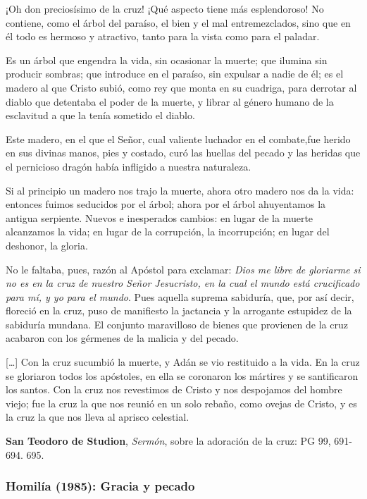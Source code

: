 \begin{patercite}
¡Oh don preciosísimo de la cruz! ¡Qué aspecto tiene más esplendoroso! No contiene, como el árbol del paraíso, el bien y el mal entremezclados, sino que en él todo es hermoso y atractivo, tanto para la vista como para el paladar.

Es un árbol que engendra la vida, sin ocasionar la muerte; que ilumina sin producir sombras; que introduce en el paraíso, sin expulsar a nadie de él; es el madero al que Cristo subió, como rey que monta en su cuadriga, para derrotar al diablo que detentaba el poder de la muerte, y librar al género humano de la esclavitud a que la tenía sometido el diablo.

Este madero, en el que el Señor, cual valiente luchador en el combate,fue herido en sus divinas manos, pies y costado, curó las huellas del pecado y las heridas que el pernicioso dragón había infligido a nuestra naturaleza.

Si al principio un madero nos trajo la muerte, ahora otro madero nos da la vida: entonces fuimos seducidos por el árbol; ahora por el árbol ahuyentamos la antigua serpiente. Nuevos e inesperados cambios: en lugar de la muerte alcanzamos la vida; en lugar de la corrupción, la incorrupción; en lugar del deshonor, la gloria.

No le faltaba, pues, razón al Apóstol para exclamar: \textit{Dios me libre de gloriarme si no es en la cruz de nuestro Señor Jesucristo, en la cual el mundo está crucificado para mí, y yo para el mundo}. Pues aquella suprema sabiduría, que, por así decir, floreció en la cruz, puso de	manifiesto la jactancia y la arrogante estupidez de la sabiduría mundana. El conjunto maravilloso de bienes que provienen de la cruz	acabaron con los gérmenes de la malicia y del pecado.

[\ldots] Con la cruz sucumbió la muerte, y Adán se vio restituido a la vida. En la cruz se gloriaron todos los apóstoles, en ella se coronaron los mártires y se santificaron los santos. Con la cruz nos revestimos de Cristo y nos despojamos del hombre viejo; fue la cruz la que nos reunió en un solo rebaño, como ovejas de Cristo, y es la cruz la que nos lleva al aprisco celestial.

\textbf{San Teodoro de Studion}, \textit{Sermón}, sobre la adoración de la cruz: PG 99, 691-694. 695.
\end{patercite}

\newpage

\subsubsection{Homilía (1985): Gracia y pecado}

